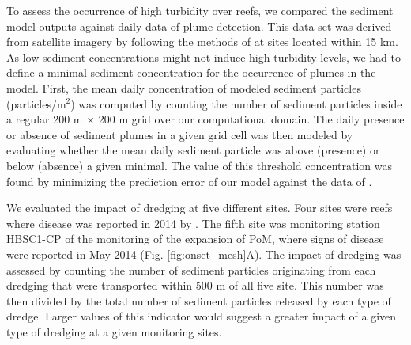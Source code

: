 \documentclass[preprint,12pt,authoryear]{elsarticle}
\begin{document}
To assess the occurrence of high turbidity over reefs, we compared the sediment model outputs against daily data of plume detection. This data set was derived from satellite imagery by \cite{cunning2019extensive} following the methods of \cite{barnes2015sediment} at sites located within 15 km. As low sediment concentrations might not induce high turbidity levels, we had to define a minimal sediment concentration for the occurrence of plumes in the model. First, the mean daily concentration of modeled sediment particles (particles/m$^2$) was computed by counting the number of sediment particles inside a regular 200 m $\times$ 200 m grid over our computational domain. The daily presence or absence of sediment plumes in a given grid cell was then modeled by evaluating whether the mean daily sediment particle was above (presence) or below (absence) a given minimal. The value of this threshold concentration was found by minimizing the prediction error of our model against the data of \cite{cunning2019extensive}. 

We evaluated the impact of dredging at five different sites. Four sites were reefs where disease was reported in 2014 by \cite{precht2016unprecedented}. The fifth site was monitoring station HBSC1-CP of the monitoring of the expansion of PoM, where signs of disease were reported in May 2014 (Fig. \ref{fig:onset_mesh}A). The impact of dredging was assessed by counting the number of sediment particles originating from each dredging that were transported within 500 m of all five site. This number was then divided by the total number of sediment particles released by each type of dredge. Larger values of this indicator would suggest a greater impact of a given type of dredging at a given monitoring sites.
\end{document}
